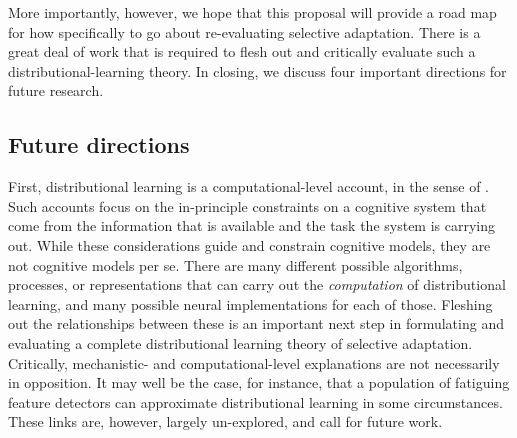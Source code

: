 More importantly, however, we hope that this proposal will provide a road map for how specifically to go about re-evaluating selective adaptation.  There is a great deal of work that is required to flesh out and critically evaluate such a distributional-learning theory.  In closing, we discuss four important directions for future research.

\subsection{Future directions}
\label{sec:future-directions-1}

First, distributional learning is a computational-level account, in the sense of .  Such accounts focus on the in-principle constraints on a cognitive system that come from the information that is available and the task the system is carrying out.  While these considerations guide and constrain cognitive models, they are not cognitive models per se.  There are many different possible algorithms, processes, or representations that can carry out the \emph{computation} of distributional learning, and many possible neural implementations for each of those.  Fleshing out the relationships between these is an important next step in formulating and evaluating a complete distributional learning theory of selective adaptation.  Critically, mechanistic- and computational-level explanations are not necessarily in opposition.  It may well be the case, for instance, that a population of fatiguing feature detectors can approximate distributional learning in some circumstances.  These links are, however, largely un-explored, and call for future work.

